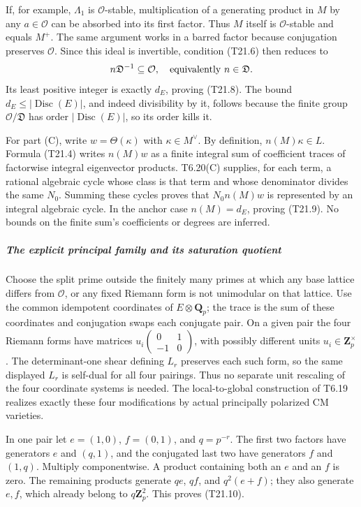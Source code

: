 If, for example, \(\Lambda_1\) is \(\mathcal O\)-stable, multiplication of a generating product in \(M\) by any \(a\in\mathcal O\) can be absorbed into its first factor. Thus \(M\) itself is \(\mathcal O\)-stable and equals \(M^+\). The same argument works in a barred factor because conjugation preserves \(\mathcal O\). Since this ideal is invertible, condition (T21.6) then reduces to \[
 n\mathfrak D^{-1}\subseteq\mathcal O,
 \quad\hbox{equivalently }n\in\mathfrak D.
\] Its least positive integer is exactly \(d_E\), proving (T21.8). The bound \(d_E\le|\operatorname{Disc}(E)|\), and indeed divisibility by it, follows because the finite group \(\mathcal O/\mathfrak D\) has order \(|\operatorname{Disc}(E)|\), so its order kills it.

For part (C), write \(w=\Theta(\kappa)\) with \(\kappa\in M^\vee\). By definition, \(n(M)\kappa\in L\). Formula (T21.4) writes \(n(M)w\) as a finite integral sum of coefficient traces of factorwise integral eigenvector products. T6.20(C) supplies, for each term, a rational algebraic cycle whose class is that term and whose denominator divides the same \(N_0\). Summing these cycles proves that \(N_0n(M)w\) is represented by an integral algebraic cycle. In the anchor case \(n(M)=d_E\), proving (T21.9). No bounds on the finite sum's coefficients or degrees are inferred.

\subparagraph{The explicit principal family and its saturation quotient}\label{the-explicit-principal-family-and-its-saturation-quotient}

Choose the split prime outside the finitely many primes at which any base lattice differs from \(\mathcal O\), or any fixed Riemann form is not unimodular on that lattice. Use the common idempotent coordinates of \(E\otimes\mathbf Q_p\); the trace is the sum of these coordinates and conjugation swaps each conjugate pair. On a given pair the four Riemann forms have matrices \(u_i\left(\begin{smallmatrix}0&1\\-1&0\end{smallmatrix}\right)\), with possibly different units \(u_i\in\mathbf Z_p^\times\). The determinant-one shear defining \(L_r\) preserves each such form, so the same displayed \(L_r\) is self-dual for all four pairings. Thus no separate unit rescaling of the four coordinate systems is needed. The local-to-global construction of T6.19 realizes exactly these four modifications by actual principally polarized CM varieties.

In one pair let \(e=(1,0)\), \(f=(0,1)\), and \(q=p^{-r}\). The first two factors have generators \(e\) and \((q,1)\), and the conjugated last two have generators \(f\) and \((1,q)\). Multiply componentwise. A product containing both an \(e\) and an \(f\) is zero. The remaining products generate \(qe\), \(qf\), and \(q^2(e+f)\); they also generate \(e,f\), which already belong to \(q\mathbf Z_p^2\). This proves (T21.10).

